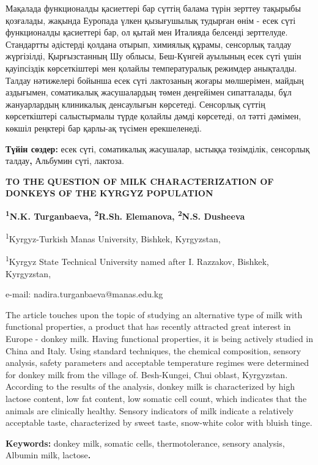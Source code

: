 Мақалада функционалды қасиеттері бар сүттің балама түрін зерттеу
тақырыбы қозғалады, жақында Еуропада үлкен қызығушылық тудырған өнім -
есек сүті функционалды қасиеттері бар, ол қытай мен Италияда белсенді
зерттелуде. Стандартты әдістерді қолдана отырып, химиялық құрамы,
сенсорлық талдау жүргізілді, Қырғызстанның Шу облысы, Беш-Күнгей
ауылының есек сүті үшін қауіпсіздік көрсеткіштері мен қолайлы
температуралық режимдер анықталды. Талдау нәтижелері бойынша есек сүті
лактозаның жоғары мөлшерімен, майдың аздығымен, соматикалық жасушалардың
төмен деңгейімен сипатталады, бұл жануарлардың клиникалық денсаулығын
көрсетеді. Сенсорлық сүттің көрсеткіштері салыстырмалы түрде қолайлы
дәмді көрсетеді, ол тәтті дәмімен, көкшіл реңктері бар қарлы-ақ түсімен
ерекшеленеді.

{\bfseries Түйін сөздер:} есек сүті, соматикалық жасушалар, ыстыққа
төзімділік, сенсорлық талдау{\bfseries ,} Альбумин сүті, лактоза.

\begin{center}
{\large\bfseries TO THE QUESTION OF MILK CHARACTERIZATION OF DONKEYS OF THE
KYRGYZ POPULATION}

{\bfseries \textsuperscript{1}N.K. Turganbaeva, \textsuperscript{2}R.Sh.
Elemanova, \textsuperscript{2}N.S. Dusheeva}

\textsuperscript{1}Kyrgyz-Turkish Manas University, Bishkek, Kyrgyzstan,

\textsuperscript{1}Kyrgyz State Technical University named after I.
Razzakov, Bishkek, Kyrgyzstan,

e-mail: nadira.turganbaeva@manas.edu.kg
\end{center}

The article touches upon the topic of studying an alternative type of
milk with functional properties, a product that has recently attracted
great interest in Europe - donkey milk. Having functional properties, it
is being actively studied in China and Italy. Using standard techniques,
the chemical composition, sensory analysis, safety parameters and
acceptable temperature regimes were determined for donkey milk from the
village of. Besh-Kungei, Chui oblast, Kyrgyzstan. According to the
results of the analysis, donkey milk is characterized by high lactose
content, low fat content, low somatic cell count, which indicates that
the animals are clinically healthy. Sensory indicators of milk indicate
a relatively acceptable taste, characterized by sweet taste, snow-white
color with bluish tinge.

{\bfseries Keywords:} donkey milk, somatic cells, thermotolerance, sensory
analysis, Albumin milk, lactose{\bfseries .}

